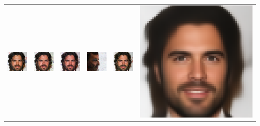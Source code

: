 \begin{table}[h!]
{\begin{tabular}{cccccc}
        \includegraphics[width=.145\textwidth]{chapter4/figures/images/celebA/original/2.png} &   
        \includegraphics[width=.145\textwidth]{chapter4/figures/images/celebA/reconstruction/2.png} &
        \includegraphics[width=.145\textwidth]{chapter4/figures/images/celebA/corrected_reconstruction/2.png} &
        \includegraphics[width=.145\textwidth]{chapter4/figures/images/celebA/diffusion_decoder_beta_0.01/2.png} &
        \includegraphics[width=.145\textwidth]{chapter4/figures/images/celebA/diffusion_decoder_beta_0/2.png} &
        \includegraphics[width=.145\textwidth]{chapter4/figures/images/celebA/VAE_reconstruction/2.png} \\
 

\end{tabular}}
\end{table}
